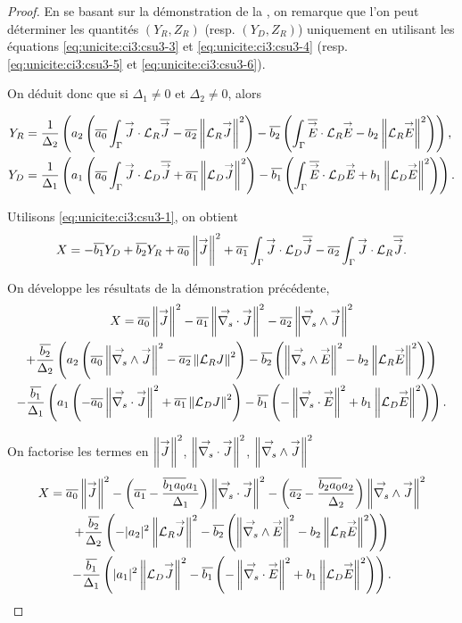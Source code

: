   \begin{proof}
    En se basant sur la démonstration de la , on remarque que l'on peut déterminer les quantités \((Y_R,Z_R)\) (resp. \((Y_D,Z_R)\)) uniquement en utilisant les équations \eqref{eq:unicite:ci3:csu3-3} et \eqref{eq:unicite:ci3:csu3-4} (resp. \eqref{eq:unicite:ci3:csu3-5} et \eqref{eq:unicite:ci3:csu3-6}).

    On déduit donc que si \(\Delta_1 \not = 0\) et \(\Delta_2 \not = 0\), alors

    \begin{align*}
      Y_R &= \frac{1}{\Delta_2}\left(a_2\left(\conj{a_0}\int_\Gamma \vJ\cdot\LR\conj{\vJ} - \conj{a_2}\norm{\LR \vJ}^2\right)  -\conj{b_2}\left(\int_\Gamma \conj{\vE}\cdot\LR{\vE} - b_2 \norm{\LR \vE}^2\right)\right), \\
      Y_D &= \frac{1}{\Delta_1}\left(a_1\left(\conj{a_0}\int_\Gamma \vJ\cdot\LD\conj{\vJ} + \conj{a_1}\norm{\LD \vJ}^2\right)  -\conj{b_1}\left(\int_\Gamma \conj{\vE}\cdot\LD{\vE} + b_1 \norm{\LD \vE}^2\right)\right).
    \end{align*}

    Utilisons \eqref{eq:unicite:ci3:csu3-1}, on obtient
    \begin{equation*}
      X = -\conj{b_1} Y_D + \conj{b_2} Y_R + \conj{a_0} \norm{\vJ}^2 + \conj{a_1} \int_\Gamma \vJ \cdot \LD \conj{\vJ} - \conj{a_2} \int_\Gamma \vJ \cdot \LR \conj{\vJ}.
    \end{equation*}

    On développe les résultats de la démonstration précédente,
    \begin{multline*}
      X = \conj{a_0} \norm{\vJ }^2 - \conj{a_1} \norm{\vdivs \vJ }^2 - \conj{a_2} \norm{\vrots \vJ }^2
      \\
      + \frac{\conj{b_2}}{\Delta_2}\left(a_2\left(\conj{a_0}\norm{\vrots \vJ}^2 - \conj{a_2}\norm{\LR J}^2\right)  -\conj{b_2}\left(\norm{\vrots\vE}^2 - b_2 \norm{\LR \vE }^2\right)\right)
      \\
      - \frac{\conj{b_1}}{\Delta_1}\left(a_1\left(-\conj{a_0}\norm{\vdivs\vJ}^2 + \conj{a_1}\norm{\LD J}^2\right)  -\conj{b_1}\left(-\norm{\vdivs\vE}^2 + b_1 \norm{\LD \vE }^2\right)\right).
    \end{multline*}

    On factorise les termes en \(\norm{\vJ}^2\), \(\norm{\vdivs\vJ}^2\),  \(\norm{\vrots\vJ}^2\)
    \begin{multline*}
      X = \conj{a_0} \norm{\vJ }^2 - \left(\conj{a_1} - \frac{\conj{b_1a_0}a_1}{\Delta_1}\right) \norm{\vdivs \vJ}^2 - \left(\conj{a_2} - \frac{\conj{b_2a_0}a_2}{\Delta_2}\right) \norm{\vrots \vJ }^2
      \\
      + \frac{\conj{b_2}}{\Delta_2}\left( - |a_2|^2\norm{\LR \vJ}^2  - \conj{b_2}\left(\norm{\vrots\vE}^2 - b_2 \norm{\LR \vE }^2\right)\right) 
      \\
      - \frac{\conj{b_1}}{\Delta_1}\left( |a_1|^2\norm{\LD \vJ}^2  - \conj{b_1}\left(-\norm{\vdivs\vE}^2 + b_1 \norm{\LD \vE }^2\right)\right).
    \end{multline*}


\end{proof}
